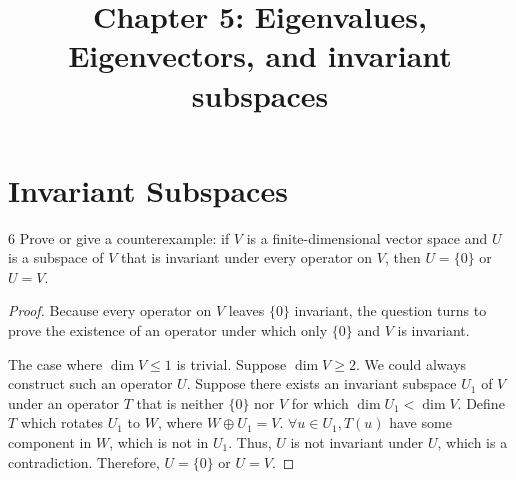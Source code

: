 \documentclass{extarticle}
\title{\vspace{-2em}Chapter 5: Eigenvalues, Eigenvectors, and invariant subspaces}
\newenvironment{problem}[1]{\begin{prob*}{#1}{}}{\end{prob*}}
\begin{document}
\maketitle

\newpage
\tableofcontents
\newpage

\section{Invariant Subspaces}

\begin{problem}{6}
Prove or give a counterexample: if $V$ is a finite-dimensional vector space and $U$ is a subspace of $V$ that is invariant under every operator on $V$, then $U = \{0\}$ or $U = V$.
\end{problem}

\begin{proof}
Because every operator on $V$ leaves $\{0\}$ invariant, the question turns to prove the existence of an operator under which only $\{0\}$ and $V$ is invariant.

The case where $\operatorname{dim} V \le 1$ is trivial.
Suppose $\operatorname{dim} V \ge 2$. We could always construct such an operator $U$. Suppose there exists an invariant subspace $U_1$ of $V$ under an operator $T$ that is neither $\{0\}$ nor $V$ for which $\operatorname{dim} U_1 < \operatorname{dim} V$. Define $T$ which rotates $U_1$ to $W$, where $W \oplus U_1 = V$. $\forall u \in U_1, T(u)$ have some component in $W$, which is not in $U_1$. Thus, $U$ is not invariant under $U$, which is a contradiction. Therefore, $U = \{0\}$ or $U = V$.
\end{proof}


\end{document}
